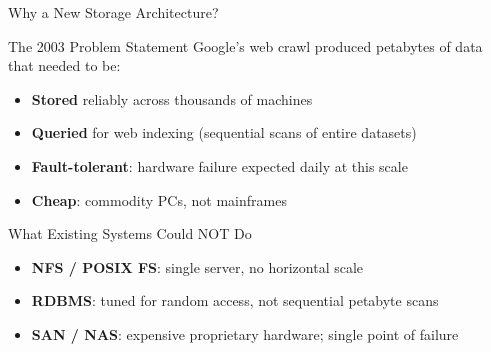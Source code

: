 \documentclass[aspectratio=169,10pt]{beamer}
\begin{document}
\begin{frame}{Why a New Storage Architecture?}
 
      \begin{block}{The 2003 Problem Statement}
        Google's web crawl produced petabytes of data that needed to be:
        \begin{itemize}
          \item \textbf{Stored} reliably across thousands of machines
          \item \textbf{Queried} for web indexing (sequential scans of entire datasets)
          \item \textbf{Fault-tolerant}: hardware failure expected daily at this scale
          \item \textbf{Cheap}: commodity PCs, not mainframes
        \end{itemize}
      \end{block}
      \vspace{6pt}
      \begin{alertblock}{What Existing Systems Could NOT Do}
        \begin{itemize}
          \item \textbf{NFS / POSIX FS}: single server, no horizontal scale
          \item \textbf{RDBMS}: tuned for random access, not sequential petabyte scans
          \item \textbf{SAN / NAS}: expensive proprietary hardware; single point of failure
        \end{itemize}
      \end{alertblock}

    
\end{frame}
\end{document}
